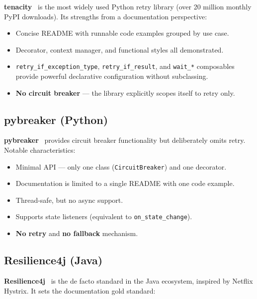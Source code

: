 \textbf{tenacity}~\cite{tenacity} is the most widely used Python retry library
(over 20 million monthly PyPI downloads).  Its strengths from a documentation
perspective:

\begin{itemize}[leftmargin=*, label=\textbullet]
    \item Concise README with runnable code examples grouped by use case.
    \item Decorator, context manager, and functional styles all demonstrated.
    \item \texttt{retry\_if\_exception\_type}, \texttt{retry\_if\_result},
          and \texttt{wait\_*} composables provide powerful declarative
          configuration without subclassing.
    \item \textbf{No circuit breaker} — the library explicitly scopes itself
          to retry only.
\end{itemize}

\subsection{pybreaker (Python)}

\textbf{pybreaker}~\cite{pybreaker} provides circuit breaker functionality
but deliberately omits retry.  Notable characteristics:

\begin{itemize}[leftmargin=*, label=\textbullet]
    \item Minimal API — only one class (\texttt{CircuitBreaker}) and one
          decorator.
    \item Documentation is limited to a single README with one code example.
    \item Thread-safe, but no async support.
    \item Supports state listeners (equivalent to \texttt{on\_state\_change}).
    \item \textbf{No retry} and \textbf{no fallback} mechanism.
\end{itemize}

\subsection{Resilience4j (Java)}

\textbf{Resilience4j}~\cite{resilience4j} is the de facto standard in the
Java ecosystem, inspired by Netflix Hystrix.  It sets the documentation
gold standard:

